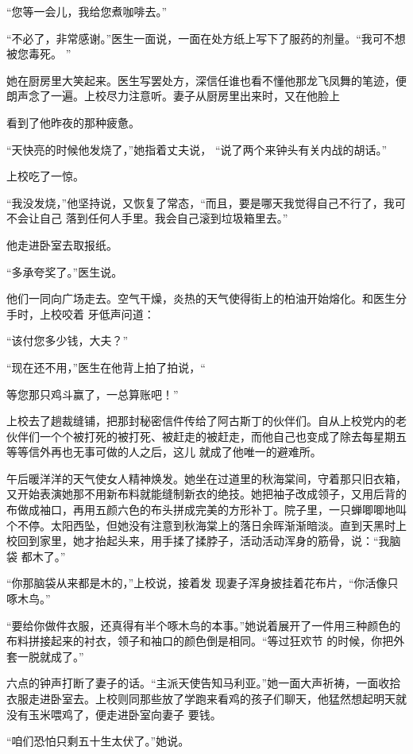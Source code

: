 \documentclass{article}
\begin{document}
“您等一会儿，我给您煮咖啡去。” 

“不必了，非常感谢。”医生一面说，一面在处方纸上写下了服药的剂量。“我可不想被您毒死。
” 

她在厨房里大笑起来。医生写罢处方，深信任谁也看不懂他那龙飞凤舞的笔迹，便朗声念了一遍。上校尽力注意听。妻子从厨房里出来时，又在他脸上

\newpage
看到了他昨夜的那种疲惫。 

“天快亮的时候他发烧了，”她指着丈夫说，
“说了两个来钟头有关内战的胡话。” 


上校吃了一惊。 

“我没发烧，”他坚持说，又恢复了常态，“而且，要是哪天我觉得自己不行了，我可不会让自己
落到任何人手里。我会自己滚到垃圾箱里去。” 


他走进卧室去取报纸。 


“多承夸奖了。”医生说。 

他们一同向广场走去。空气干燥，炎热的天气使得街上的柏油开始熔化。和医生分手时，上校咬着
牙低声问道： 


“该付您多少钱，大夫？” 

“现在还不用，”医生在他背上拍了拍说，“
\newpage

等您那只鸡斗赢了，一总算账吧！” 

上校去了趟裁缝铺，把那封秘密信件传给了阿古斯丁的伙伴们。自从上校党内的老伙伴们一个个被打死的被打死、被赶走的被赶走，而他自己也变成了除去每星期五等等信外再也无事可做的人之后，这儿
就成了他唯一的避难所。 

午后暖洋洋的天气使女人精神焕发。她坐在过道里的秋海棠间，守着那只旧衣箱，又开始表演她那不用新布料就能缝制新衣的绝技。她把袖子改成领子，又用后背的布做成袖口，再用五颜六色的布头拼成完美的方形补丁。院子里，一只蝉唧唧地叫个不停。太阳西坠，但她没有注意到秋海棠上的落日余晖渐渐暗淡。直到天黑时上校回到家里，她才抬起头来，用手揉了揉脖子，活动活动浑身的筋骨，说：“我脑袋
都木了。” 

“你那脑袋从来都是木的，”上校说，接着发
现妻子浑身披挂着花布片，“你活像只啄木鸟。” 

\newpage

“要给你做件衣服，还真得有半个啄木鸟的本事。”她说着展开了一件用三种颜色的布料拼接起来的衬衣，领子和袖口的颜色倒是相同。“等过狂欢节
的时候，你把外套一脱就成了。” 

六点的钟声打断了妻子的话。“主派天使告知马利亚。”她一面大声祈祷，一面收拾衣服走进卧室去。上校则同那些放了学跑来看鸡的孩子们聊天，他猛然想起明天就没有玉米喂鸡了，便走进卧室向妻子
要钱。 


“咱们恐怕只剩五十生太伏了。”她说。 
\end{document}
